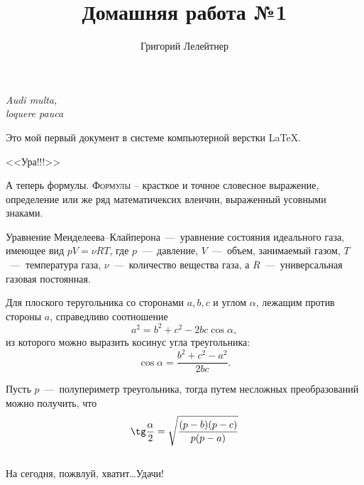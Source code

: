 \documentclass[12pt]{article}
\title{Домашняя работа №1}
\author{Григорий Лелейтнер}
\date{}
\begin{document}
	\maketitle
    
    \begin{flushright}
    {\itshape
        Audi multa,\\
        loquere pauca
    }
    \end{flushright}
    \vspace{20pt}
    
    Это мой первый документ в системе компьютерной верстки \LaTeX.
    
    \begin{center}
        {\Huge \sffamily <<Ура!!!>> }
    \end{center}
    
    
    А теперь формулы. \textsc{Формулы} -- красткое и точное словесное выражение, определение или же ряд математичексих влеичин, выраженный усовными знаками.
    
    \vspace{15pt}
    \hspace{14pt}{\Large \bfseries Термодинамика}
    
    Уравнение Менделеева--Клайперона~---~уравнение состояния идеального газа, имеющее вид $pV = \nu RT$, где $p$~---~давление, $V$~---~объем, занимаемый газом, $T$~---~температура газа, $\nu$~---~количество вещества газа, а $R$~---~универсальная газовая постоянная.
    
    \vspace{15pt}
    \hspace{14pt}{\Large \bfseries Геометрия}
    
    Для плоского теругольника со сторонами $a, b, c$ и углом $\alpha$, лежащим против стороны $a$, справедливо соотношение
    $$a^2 = b^2 + c^2 - 2bc\cos\alpha,$$
    из которого можно выразить косинус угла треугольника:
    $$\cos\alpha = \frac{b^2 + c^2 - a^2}{2bc}.$$
    
    Пусть $p$~---~полупериметр треугольника, тогда путем несложных преобразований можно получить, что 
    $$\tg \frac{\alpha}{2} = \sqrt{\frac{(p-b)(p-c)}{p(p-a)}}$$\\
    \vspace{1cm}
    На сегодня, пожвлуй, хватит\dots Удачи!
    
\end{document}
